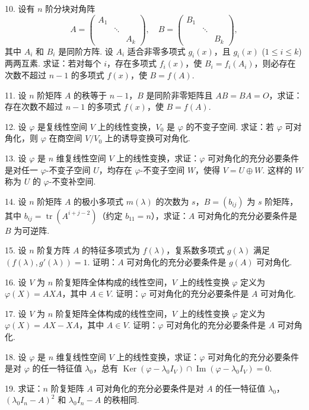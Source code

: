 \documentclass[UTF8, 12pt, fontset=fandol, oneside]{ctexart}
\begin{document}
10. 设有 $n$ 阶分块对角阵
\[
A=\left(\begin{array}{ccc}
A_1 & & \\
& \ddots & \\
& & A_k
\end{array}\right),\quad
B=\left(\begin{array}{ccc}
B_1 & & \\
& \ddots & \\
& & B_k
\end{array}\right),
\]
其中 $A_i$ 和 $B_i$ 是同阶方阵. 设 $A_i$ 适合非零多项式 $g_i(x)$，且 $g_i(x)$ ($1\leq i\leq k$) 两两互素. 求证：若对每个 $i$，存在多项式 $f_i(x)$，使 $B_i=f_i(A_i)$，则必存在次数不超过 $n-1$ 的多项式 $f(x)$，使 $B=f(A)$.

11. 设 $n$ 阶矩阵 $A$ 的秩等于 $n-1$，$B$ 是同阶非零矩阵且 $AB=BA=O$，求证：存在次数不超过 $n-1$ 的多项式 $f(x)$，使 $B=f(A)$.

12. 设 $\varphi$ 是复线性空间 $V$ 上的线性变换，$V_0$ 是 $\varphi$ 的不变子空间. 求证：若 $\varphi$ 可对角化，则 $\varphi$ 在商空间 $V/V_0$ 上的诱导变换可对角化.

13. 设 $\varphi$ 是 $n$ 维复线性空间 $V$ 上的线性变换，求证：$\varphi$ 可对角化的充分必要条件是对任一 $\varphi$-不变子空间 $U$，均存在 $\varphi$-不变子空间 $W$，使得 $V=U\oplus W$. 这样的 $W$ 称为 $U$ 的 $\varphi$-不变补空间.

14. 设 $n$ 阶矩阵 $A$ 的极小多项式 $m(\lambda)$ 的次数为 $s$，$B=(b_{ij})$ 为 $s$ 阶矩阵，其中 $b_{ij}=\operatorname{tr}(A^{i+j-2})$（约定 $b_{11}=n$），求证：$A$ 可对角化的充分必要条件是 $B$ 为可逆阵.

15. 设 $n$ 阶复方阵 $A$ 的特征多项式为 $f(\lambda)$，复系数多项式 $g(\lambda)$ 满足 $(f(\lambda),g'(\lambda))=1$. 证明：$A$ 可对角化的充分必要条件是 $g(A)$ 可对角化.

16. 设 $V$ 为 $n$ 阶复矩阵全体构成的线性空间，$V$ 上的线性变换 $\varphi$ 定义为 $\varphi(X)=AXA$，其中 $A\in V$. 证明：$\varphi$ 可对角化的充分必要条件是 $A$ 可对角化.

17. 设 $V$ 为 $n$ 阶复矩阵全体构成的线性空间，$V$ 上的线性变换 $\varphi$ 定义为 $\varphi(X)=AX-XA$，其中 $A\in V$. 证明：$\varphi$ 可对角化的充分必要条件是 $A$ 可对角化.

18. 设 $\varphi$ 是 $n$ 维复线性空间 $V$ 上的线性变换，求证：$\varphi$ 可对角化的充分必要条件是对 $\varphi$ 的任一特征值 $\lambda_0$，总有 $\operatorname{Ker}(\varphi-\lambda_0I_V)\cap\operatorname{Im}(\varphi-\lambda_0I_V)=0$.

19. 求证：$n$ 阶复矩阵 $A$ 可对角化的充分必要条件是对 $A$ 的任一特征值 $\lambda_0$，$(\lambda_0I_n-A)^2$ 和 $\lambda_0I_n-A$ 的秩相同.
\end{document}
